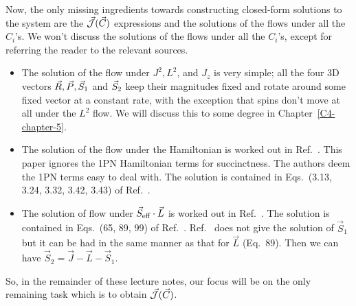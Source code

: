 Now, the only missing ingredients towards constructing closed-form solutions
to the system are the $\vec{\mathcal{J}}(\vec{C})$ expressions and
the solutions of the flows under all the $C_i$'s.
We won't discuss the solutions of the flows under all the $C_i$'s, 
except for referring the reader to the relevant sources.
\begin{itemize}
\item The solution of the flow under $J^2, L^2$, and $J_z$ is very simple;
all the four 3D vectors 
$\vec{R}, \vec{P}, \vec{S}_1$ and $\vec{S}_2$ 
keep their magnitudes fixed and 
rotate around some fixed vector at a constant rate, with the exception that
spins don't move at all under the $L^2$ flow. We will discuss this 
to some degree in Chapter~\ref{C4-chapter-5}.
\item The solution of the flow under the Hamiltonian is worked out in 
Ref.~\cite{Cho:2019brd}. This paper ignores the 1PN Hamiltonian terms
for succinctness.  The authors deem the 1PN terms easy to deal with.
The solution is contained in Eqs.~(3.13, 3.24, 3.32, 3.42, 3.43)
of Ref.~\cite{Cho:2019brd}.
\item The solution of flow under $\vec{S}_{\text{eff}}\cdot \vec{L}$ is worked out in 
Ref.~\cite{tanay2021action}.
The solution is contained in Eqs.~(65, 89, 99)
of Ref.~\cite{Cho:2019brd}. Ref.~\cite{Cho:2019brd} does not give the solution
of $\vec{S}_1$ but it can be had in the same manner as that for $\vec{L}$ (Eq.~89).
Then we can have $\vec{S}_2 = \vec{J} - \vec{L} -\vec{S}_1$.
\end{itemize}
So, in the remainder of these lecture notes, our focus will be on the only
remaining task which is to obtain $\vec{\mathcal{J}}(\vec{C})$.







